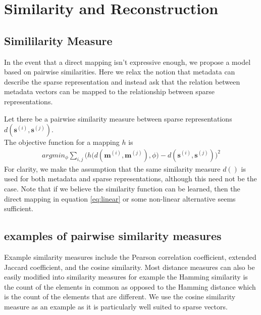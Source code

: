 \documentclass{article} %
\newcommand{\Mt}[1]{\textbf{m}^{(#1)}}
\newcommand{\st}[1]{\textbf{s}^{(#1)}}
\newcommand{\pairsim}[1]{d(#1)}
\newcommand{\learned}[1]{h\Big( \pairsim{#1},\phi \Big)} %
\begin{document}
\section{Similarity and Reconstruction}

\subsection{Simililarity Measure}
In the event that a direct mapping isn't expressive enough, we propose a model based on pairwise similarities. Here we relax the notion that metadata can describe the sparse representation and instead ask that the relation between metadata vectors can be mapped to the relationship between sparse representations.

Let there be a pairwise similarity measure between sparse representations $\pairsim{\st{i},\st{j}}$. \\
The objective function for a mapping $h$ is 
%	
%
\begin{eqnarray}
	  argmin_{\phi} \sum_{i,j} \bigg( \learned{\Mt{i},\Mt{j}} - \pairsim{\st{i},\st{j} } \bigg)^2 
\end{eqnarray}
For clarity, we make the assumption that the same similarity measure $\pairsim{}$ is used for both metadata and sparse representations, although this need not be the case. Note that if we believe the similarity function can be learned, then the direct mapping in equation \ref{eq:linear} or some non-linear alternative seems sufficient.

\subsection{examples of pairwise similarity measures}
Example similarity measures include the Pearson correlation coefficient, extended Jaccard coefficient, and the cosine similarity. Most distance measures can also be easily modified into similarity measures for example the Hamming similarity is the count of the elements in common as opposed to the Hamming distance which is the count of the elements that are different. We use the cosine similarity measure as an example as it is particularly well suited to sparse vectors.  
\end{document}
